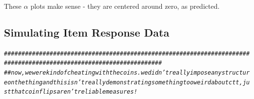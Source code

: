 \documentclass{article}\usepackage[]{graphicx}\usepackage[]{color}
\makeatletter
\newcommand{\hlcom}[1]{\textcolor[rgb]{0.678,0.584,0.686}{\textit{#1}}}%
\newenvironment{kframe}{%
 \def\at@end@of@kframe{}%
 \ifinner\ifhmode%
  \def\at@end@of@kframe{\end{minipage}}%
  \begin{minipage}{\columnwidth}%
 \fi\fi%
 \def\FrameCommand##1{\hskip\@totalleftmargin \hskip-\fboxsep
 \colorbox{shadecolor}{##1}\hskip-\fboxsep
     \hskip-\linewidth \hskip-\@totalleftmargin \hskip\columnwidth}%
 \MakeFramed {\advance\hsize-\width
   \@totalleftmargin\z@ \linewidth\hsize
   \@setminipage}}%
 {\par\unskip\endMakeFramed%
 \at@end@of@kframe}
\newenvironment{knitrout}{}{} %
\makeatother
\begin{document}
    These $\alpha$ plots make sense - they are centered around zero, as predicted.

  \subsection{Simulating Item Response Data}

\begin{knitrout}
\color{fgcolor}\begin{kframe}
\begin{alltt}
\hlcom{###################################################################################################################}
\hlcom{##now, we were kind of cheating with the coins. we didn't really impose any structure on the thing and this isn't really demonstrating something too weird about ctt, just that coin flips aren't reliable measures!}


\end{alltt}
\end{kframe}
\end{knitrout}
\end{document}
